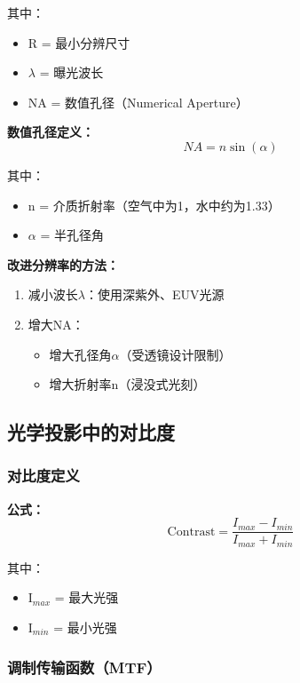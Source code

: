 \documentclass[UTF8,12pt,a4paper]{ctexart}
\begin{document}
其中：
\begin{itemize}
    \item R = 最小分辨尺寸
    \item $\lambda$ = 曝光波长
    \item NA = 数值孔径（Numerical Aperture）
\end{itemize}

\textbf{数值孔径定义：}
\begin{equation}
NA = n\sin(\alpha)
\end{equation}

其中：
\begin{itemize}
    \item n = 介质折射率（空气中为1，水中约为1.33）
    \item $\alpha$ = 半孔径角
\end{itemize}

\textbf{改进分辨率的方法：}
\begin{enumerate}
    \item 减小波长$\lambda$：使用深紫外、EUV光源
    \item 增大NA：
    \begin{itemize}
        \item 增大孔径角$\alpha$（受透镜设计限制）
        \item 增大折射率n（浸没式光刻）
    \end{itemize}
\end{enumerate}

\subsection{光学投影中的对比度}

\subsubsection{对比度定义}

\textbf{公式：}
\begin{equation}
\text{Contrast} = \frac{I_{max} - I_{min}}{I_{max} + I_{min}}
\end{equation}

其中：
\begin{itemize}
    \item I$_{max}$ = 最大光强
    \item I$_{min}$ = 最小光强
\end{itemize}

\subsubsection{调制传输函数（MTF）}
\end{document}
